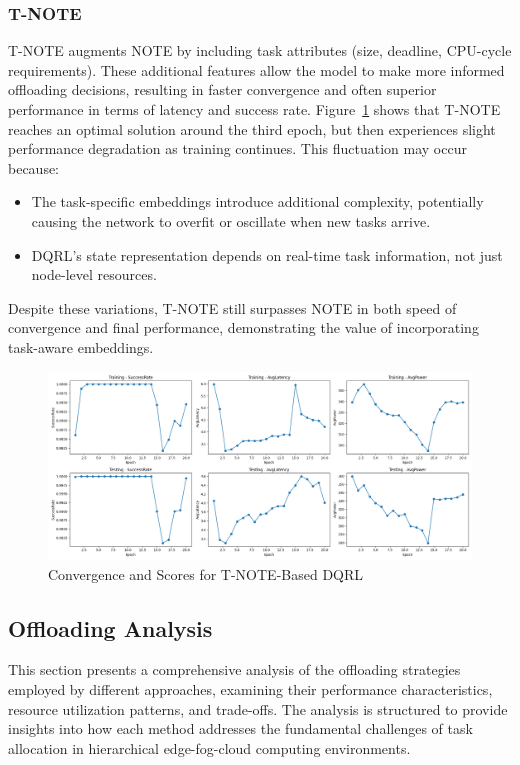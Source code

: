\documentclass[preprint,12pt]{elsarticle}
\begin{document}
\subsubsection{T-NOTE}
T-NOTE augments NOTE by including task attributes (size, deadline, CPU-cycle requirements). These additional features allow the model to make more informed offloading decisions, resulting in faster convergence and often superior performance in terms of latency and success rate. Figure~\ref{fig:T-NOTE-score-plot} shows that T-NOTE reaches an optimal solution around the third epoch, but then experiences slight performance degradation as training continues. This fluctuation may occur because:
\begin{itemize}
    \item The task-specific embeddings introduce additional complexity, potentially causing the network to overfit or oscillate when new tasks arrive.
    \item DQRL’s state representation depends on real-time task information, not just node-level resources.
\end{itemize}
Despite these variations, T-NOTE still surpasses NOTE in both speed of convergence and final performance, demonstrating the value of incorporating task-aware embeddings.

\begin{figure}[H]
    \centering
    \includegraphics[width=1\linewidth]{figs/taskformer_score_plot.png}
    \caption{Convergence and Scores for T-NOTE-Based DQRL}
    \label{fig:T-NOTE-score-plot}
\end{figure}


\subsection{Offloading Analysis}
\label{subsec:offloading-analysis}

This section presents a comprehensive analysis of the offloading strategies employed by different approaches, examining their performance characteristics, resource utilization patterns, and trade-offs. The analysis is structured to provide insights into how each method addresses the fundamental challenges of task allocation in hierarchical edge-fog-cloud computing environments.
\end{document}
